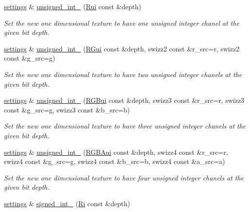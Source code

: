 \begin{DoxyCompactItemize}
\hyperlink{classgfx_1_1texture__1D_1_1settings}{settings} \& \hyperlink{classgfx_1_1texture__1D_1_1settings_a270eac9be8d272116b28193a846613e9}{unsigned\-\_\-int\-\_} (\hyperlink{classgfx_1_1Rui}{Rui} const \&depth)
\begin{DoxyCompactList}\small\item\em Set the new one dimensional texture to have one unsigned integer chanel at the given bit depth. \end{DoxyCompactList}\item 
\hyperlink{classgfx_1_1texture__1D_1_1settings}{settings} \& \hyperlink{classgfx_1_1texture__1D_1_1settings_a88b62136a38de5a219b24fa144715232}{unsigned\-\_\-int\-\_} (\hyperlink{classgfx_1_1RGui}{R\-Gui} const \&depth, swizz2 const \&r\-\_\-src=r, swizz2 const \&g\-\_\-src=g)
\begin{DoxyCompactList}\small\item\em Set the new one dimensional texture to have two unsigned integer chanels at the given bit depth. \end{DoxyCompactList}\item 
\hyperlink{classgfx_1_1texture__1D_1_1settings}{settings} \& \hyperlink{classgfx_1_1texture__1D_1_1settings_a6a33a9010ac7b5ec9a24ab25ff8675a2}{unsigned\-\_\-int\-\_} (\hyperlink{classgfx_1_1RGBui}{R\-G\-Bui} const \&depth, swizz3 const \&r\-\_\-src=r, swizz3 const \&g\-\_\-src=g, swizz3 const \&b\-\_\-src=b)
\begin{DoxyCompactList}\small\item\em Set the new one dimensional texture to have three unsigned integer chanels at the given bit depth. \end{DoxyCompactList}\item 
\hyperlink{classgfx_1_1texture__1D_1_1settings}{settings} \& \hyperlink{classgfx_1_1texture__1D_1_1settings_ad486f4bcccefe9591ee329215b8f99be}{unsigned\-\_\-int\-\_} (\hyperlink{classgfx_1_1RGBAui}{R\-G\-B\-Aui} const \&depth, swizz4 const \&r\-\_\-src=r, swizz4 const \&g\-\_\-src=g, swizz4 const \&b\-\_\-src=b, swizz4 const \&a\-\_\-src=a)
\begin{DoxyCompactList}\small\item\em Set the new one dimensional texture to have four unsigned integer chanels at the given bit depth. \end{DoxyCompactList}\item 
\hyperlink{classgfx_1_1texture__1D_1_1settings}{settings} \& \hyperlink{classgfx_1_1texture__1D_1_1settings_afb4023b97ca3015d45e8b25c6bd8cdb0}{signed\-\_\-int\-\_} (\hyperlink{classgfx_1_1Ri}{Ri} const \&depth)

\end{DoxyCompactItemize}
